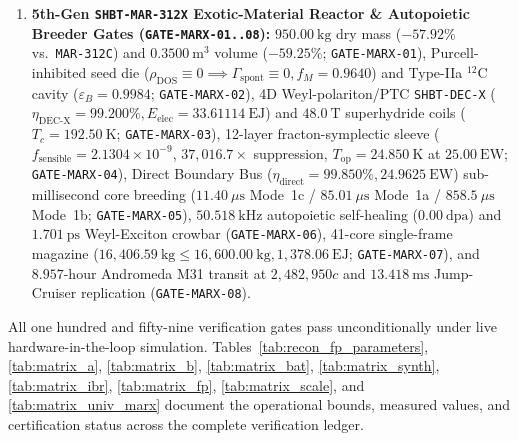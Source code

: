 \documentclass[11pt,onecolumn]{article}
\begin{document}
\begin{enumerate}
    \item \textbf{5th-Gen \texttt{SHBT-MAR-312X} Exotic-Material Reactor \& Autopoietic Breeder Gates (\texttt{GATE-}\allowbreak\texttt{MARX-01..08}):} $950.00~\mathrm{kg}$ dry mass ($-57.92\%$ vs.\ \texttt{MAR-312C}) and $0.3500~\mathrm{m}^3$ volume ($-59.25\%$; \texttt{GATE-MARX-01}), Purcell-inhibited seed die ($\rho_{\text{DOS}} \equiv 0 \implies \Gamma_{\text{spont}} \equiv 0, f_M = 0.9640$) and Type-IIa $^{12}\text{C}$ cavity ($\varepsilon_B = 0.9984$; \texttt{GATE-MARX-02}), 4D Weyl-polariton/PTC \texttt{SHBT-DEC-X} ($\eta_{\text{DEC-X}} = 99.200\%, E_{\text{elec}} = 33.61114~\text{EJ}$) and $48.0~\text{T}$ superhydride coils ($T_c = 192.50~\text{K}$; \texttt{GATE-MARX-03}), 12-layer fracton-symplectic sleeve ($f_{\text{sensible}} = 2.1304\times 10^{-9}$, $37{,}016.7\times$ suppression, $T_{\text{op}} = 24.850~\text{K}$ at $25.00~\text{EW}$; \texttt{GATE-MARX-04}), Direct Boundary Bus ($\eta_{\text{direct}} = 99.850\%, 24.9625~\text{EW}$) sub-millisecond core breeding ($11.40~\mu\text{s}$ Mode~1c / $85.01~\mu\text{s}$ Mode~1a / $858.5~\mu\text{s}$ Mode~1b; \texttt{GATE-MARX-05}), $50.518~\text{kHz}$ autopoietic self-healing ($0.00~\text{dpa}$) and $1.701~\text{ps}$ Weyl-Exciton crowbar (\texttt{GATE-MARX-06}), 41-core single-frame magazine ($16{,}406.59~\mathrm{kg} \le 16{,}600.00~\mathrm{kg}, 1{,}378.06~\mathrm{EJ}$; \texttt{GATE-MARX-07}), and $8.957\text{-hour}$ Andromeda M31 transit at $2{,}482{,}950c$ and $13.418~\text{ms}$ Jump-Cruiser replication (\texttt{GATE-MARX-08}).
\end{enumerate}
All one hundred and fifty-nine verification gates pass unconditionally under live hardware-in-the-loop simulation. Tables~\ref{tab:recon_fp_parameters}, \ref{tab:matrix_a}, \ref{tab:matrix_b}, \ref{tab:matrix_bat}, \ref{tab:matrix_synth}, \ref{tab:matrix_ibr}, \ref{tab:matrix_fp}, \ref{tab:matrix_scale}, and \ref{tab:matrix_univ_marx} document the operational bounds, measured values, and certification status across the complete verification ledger.
\end{document}
